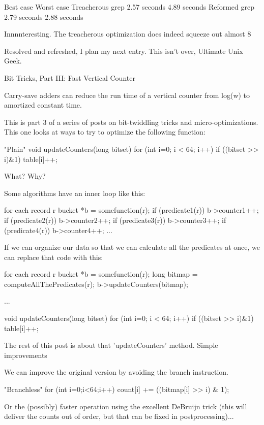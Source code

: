 {{{{{{	Best case	Worst case
Treacherous grep	2.57 seconds	4.89 seconds
Reformed grep	2.79 seconds	2.88 seconds

Innnnteresting. The treacherous optimization does indeed squeeze out almost 8%

Resolved and refreshed, I plan my next entry. This isn't over, Ultimate Unix Geek. 

    
Bit Tricks, Part III: Fast Vertical Counter

Carry-save adders can reduce the run time of a vertical counter from log(w) to amortized constant time.

This is part 3 of a series of posts on bit-twiddling tricks and micro-optimizations. This one looks at ways to try to optimize the following function:

"Plain"
void updateCounters(long bitset) {
  for (int i=0; i < 64; i++)
    if ((bitset >> i)&1) table[i]++;
}

What? Why?

Some algorithms have an inner loop like this:

  for each record r {
    bucket *b = somefunction(r);
    if (predicate1(r)) b->counter1++;
    if (predicate2(r)) b->counter2++;
    if (predicate3(r)) b->counter3++;
    if (predicate4(r)) b->counter4++;
    ...
  }

If we can organize our data so that we can calculate all the predicates at once, we can replace that code with this:

  for each record r {
    bucket *b = somefunction(r);
    long bitmap = computeAllThePredicates(r);
    b->updateCounters(bitmap);
  }

  ...

  void updateCounters(long bitset) {
    for (int i=0; i < 64; i++)
      if ((bitset >> i)&1) table[i]++;
  }

The rest of this post is about that 'updateCounters' method.
Simple improvements

We can improve the original version by avoiding the branch instruction.

"Branchless"
  for (int i=0;i<64;i++) 
    count[i] += ((bitmap[i] >> i) & 1);

Or the (possibly) faster operation using the excellent DeBruijn trick (this will deliver the counts out of order, but that can be fixed in postprocessing)...

}}}}}}

